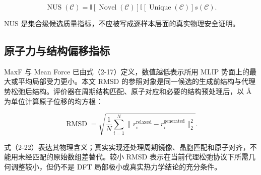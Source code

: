 \[
\operatorname{NUS}(\mathcal C)
=\mathbb I[\operatorname{Novel}(\mathcal C)]
\mathbb I[\operatorname{Unique}(\mathcal C)]
s(\mathcal C).
\tag{2-21}
\]

NUS 是集合级候选质量指标，不应被写成逐样本层面的真实物理安全证明。

\subsection{原子力与结构偏移指标}

MaxF 与 Mean Force 已由式（2-17）定义，数值越低表示所用 MLIP 势面上的最大或平均局部受力更小。本文 RMSD 的参照对象是同一候选的生成前结构与代理势松弛后结构。评价器在周期结构匹配、原子对应和必要的结构预处理后，以 Å 为单位计算原子位移的均方根：

\[
\operatorname{RMSD}
=\sqrt{\frac{1}{N}\sum_{i=1}^{N}\lVert r_i^{\mathrm{relaxed}}-r_i^{\mathrm{generated}}\rVert_2^2}.
\tag{2-22}
\]

式（2-22）表达其物理含义；真实实现还处理周期镜像、晶胞匹配和原子对齐，不能用未经匹配的原始数组差替代。较小 RMSD 表示在当前代理松弛协议下所需几何调整较小，但仍不是 DFT 局部极小或真实热力学结论的充分条件。


